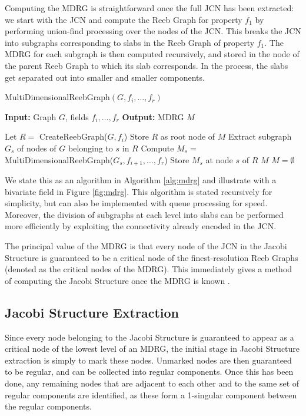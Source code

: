 \documentclass[twocolumn]{article}
\newcommand{\figref}[1]{Figure \ref{fig:#1}}
\newcommand{\algoref}[1]{Algorithm \ref{alg:#1}}
\begin{document}
Computing the MDRG is straightforward once the full JCN has been extracted: we 
start with the JCN and compute the Reeb Graph for property $f_1$ by performing
union-find processing over the nodes of the JCN.  This breaks the JCN into subgraphs
corresponding to slabs in the Reeb Graph of property $f_1$. The MDRG for each 
subgraph is then computed recursively, and stored in the node of the parent Reeb 
Graph to which its slab corresponds. In the process, the slabs get separated out into 
smaller and smaller components.

\begin{algorithm}
\caption{{\sc MultiDimensionalReebGraph}$(G, f_i,\ldots, f_r)$}
\label{alg:mdrg}
{\bf Input:} Graph $G$, fields $f_i, \ldots, f_r$
{\bf Output:} MDRG $M$
\begin{algorithmic}[1]
\State	Let $R = $ CreateReebGraph($G, f_i$) 
\State Store $R$ as root node of $M$
\State Extract subgraph $G_s$ of nodes of $G$ belonging to $s$ in $R$ 
\State Compute $M_s = $ \small{MultiDimensionalReebGraph($G_s, f_{i+1}, \allowbreak \ldots, f_r$)}
\State	Store $M_s$ at node $s$ of $R$
\EndFor
\State \Return $M$
\Else
\State \Return $M = \emptyset$
\EndIf
\end{algorithmic}
\end{algorithm}

We state this as an algorithm in \algoref{mdrg} and illustrate with a bivariate
field in \figref{mdrg}.   This algorithm is stated recursively for simplicity, but can also
be implemented with queue processing for speed. Moreover, the division of subgraphs
at each level into slabs can be performed more efficiently by exploiting the connectivity 
already encoded in the JCN.  

The principal value of the MDRG is that every node of the JCN in the Jacobi Structure is
guaranteed to be a critical node of the finest-resolution Reeb
Graphs (denoted as the critical nodes of the MDRG). This immediately gives a method of computing the Jacobi Structure once the MDRG
is known \cite{2014-EuroVis-short}.

\subsection{Jacobi Structure Extraction}
\label{sec:JacobiStructureExtraction}
Since every node belonging to the Jacobi Structure is guaranteed to appear as a critical node
of the lowest level of an MDRG, the initial stage in Jacobi Structure extraction is simply to
mark these nodes.  Unmarked nodes are then guaranteed to be regular, and can be collected
into regular components.  Once this has been done, any remaining nodes that are adjacent
to each other and to the same set of regular components are identified, as these form a 
 1-singular component between the regular components.
\end{document}
